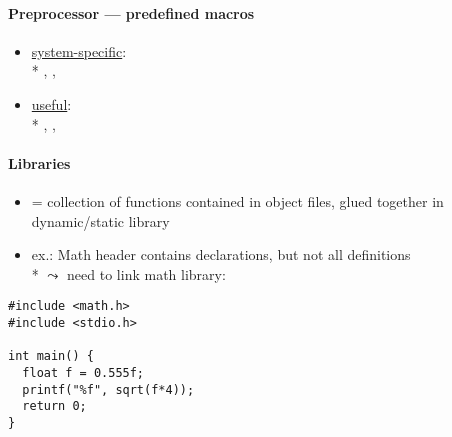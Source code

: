 \paragraph{Preprocessor --- predefined macros}
\begin{itemize}
  \item \underline{system-specific}: \\*
    , , 
  \item \underline{useful}: \\*
    , , 
\end{itemize}

\paragraph{Libraries}
\begin{itemize}
  \item = collection of functions contained in object files, glued together in dynamic/static library
  \item ex.: Math header contains declarations, but not all definitions \\*
    \( \leadsto \) need to link math library: 
\end{itemize}
\begin{lstlisting}[style=customc]
#include <math.h>
#include <stdio.h>

int main() {
  float f = 0.555f;
  printf("%f", sqrt(f*4));
  return 0;
}
\end{lstlisting}
